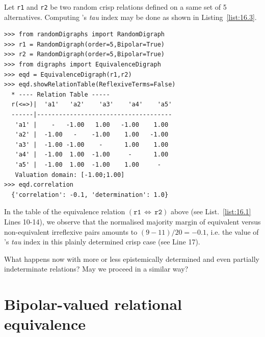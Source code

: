Let \texttt{r1} and \texttt{r2} be two random crisp relations defined on a same set of 5 alternatives. Computing \Kendall 's \emph{tau} index may be done as shown in Listing~\vref{list:16.3}.
\begin{lstlisting}[caption={Computing a relational equivalence digraph},label=list:16.3]
>>> from randomDigraphs import RandomDigraph
>>> r1 = RandomDigraph(order=5,Bipolar=True)
>>> r2 = RandomDigraph(order=5,Bipolar=True)
>>> from digraphs import EquivalenceDigraph
>>> eqd = EquivalenceDigraph(r1,r2)
>>> eqd.showRelationTable(ReflexiveTerms=False)
  * ---- Relation Table -----
  r(<=>)|  'a1'	  'a2'	  'a3'	  'a4'	  'a5'	  
  ------|-------------------------------------
   'a1' |    -   -1.00   1.00   -1.00    1.00	 
   'a2' |  -1.00   -    -1.00    1.00   -1.00	 
   'a3' |  -1.00 -1.00    -      1.00    1.00	 
   'a4' |  -1.00  1.00  -1.00     -      1.00	 
   'a5' |  -1.00  1.00  -1.00    1.00     - 	 
   Valuation domain: [-1.00;1.00]
>>> eqd.correlation
  {'correlation': -0.1, 'determination': 1.0}
\end{lstlisting}

In the table of the equivalence relation $(\mathtt{r1}\, \Leftrightarrow\, \mathtt{r2})$ above (see List.~\vref{list:16.1} Lines 10-14), we observe that the normalised majority margin of equivalent versus non-equivalent irreflexive pairs amounts to $(9 - 11)/20 = -0.1$, i.e. the value of \Kendall 's \emph{tau} index in this plainly determined crisp case (see Line 17).

What happens now with more or less epistemically determined and even partially indeterminate relations? May we proceed in a similar way?

\section{Bipolar-valued relational equivalence}
\label{sec:16.3}

